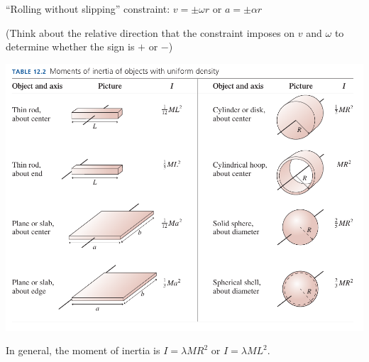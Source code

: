 \begin{landscape}
\begin{center}
\begin{tabular}{| l | l |}
			\hline
						\hline
		\end{tabular}
	
	
	\bigskip
	
		``Rolling without slipping'' constraint: $v = \pm \omega r$ or $a = \pm \alpha r$
		
		\medskip
		
		(Think about the relative direction that the constraint imposes on $v$ and $\omega$ to determine whether the sign is $+$ or $-$)
	
	\end{center}
	
	
	\begin{center}

	\includegraphics[width=7in]{moment-table.png}
	
	\Large
	
	In general, the moment of inertia is $I = \lambda MR^2$ or $I=\lambda ML^2$.
	
	\end{center}

\end{landscape}
